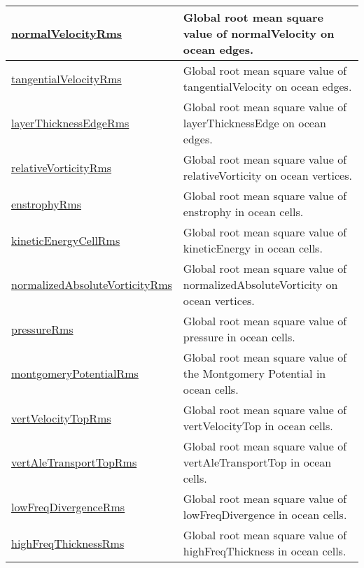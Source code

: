 {\begin{center}
\begin{longtable}{| p{2.0in} | p{4.0in} |}
    \hline
    \hyperref[subsec:var_sec_globalStatsAM_normalVelocityRms]{normalVelocityRms} & Global root mean square value of normalVelocity on ocean edges. \\
    \hline
    \hyperref[subsec:var_sec_globalStatsAM_tangentialVelocityRms]{tangentialVelocityRms} & Global root mean square value of tangentialVelocity on ocean edges. \\
    \hline
    \hyperref[subsec:var_sec_globalStatsAM_layerThicknessEdgeRms]{layerThicknessEdgeRms} & Global root mean square value of layerThicknessEdge on ocean edges. \\
    \hline
    \hyperref[subsec:var_sec_globalStatsAM_relativeVorticityRms]{relativeVorticityRms} & Global root mean square value of relativeVorticity on ocean vertices. \\
    \hline
    \hyperref[subsec:var_sec_globalStatsAM_enstrophyRms]{enstrophyRms} & Global root mean square value of enstrophy in ocean cells. \\
    \hline
    \hyperref[subsec:var_sec_globalStatsAM_kineticEnergyCellRms]{kineticEnergyCellRms} & Global root mean square value of kineticEnergy in ocean cells. \\
    \hline
    \hyperref[subsec:var_sec_globalStatsAM_normalizedAbsoluteVorticityRms]{normalizedAbsoluteVorticityRms} & Global root mean square value of normalizedAbsoluteVorticity on ocean vertices. \\
    \hline
    \hyperref[subsec:var_sec_globalStatsAM_pressureRms]{pressureRms} & Global root mean square value of pressure in ocean cells. \\
    \hline
    \hyperref[subsec:var_sec_globalStatsAM_montgomeryPotentialRms]{montgomeryPotentialRms} & Global root mean square value of the Montgomery Potential in ocean cells. \\
    \hline
    \hyperref[subsec:var_sec_globalStatsAM_vertVelocityTopRms]{vertVelocityTopRms} & Global root mean square value of vertVelocityTop in ocean cells. \\
    \hline
    \hyperref[subsec:var_sec_globalStatsAM_vertAleTransportTopRms]{vertAleTransportTopRms} & Global root mean square value of vertAleTransportTop in ocean cells. \\
    \hline
    \hyperref[subsec:var_sec_globalStatsAM_lowFreqDivergenceRms]{lowFreqDivergenceRms} & Global root mean square value of lowFreqDivergence in ocean cells. \\
    \hline
    \hyperref[subsec:var_sec_globalStatsAM_highFreqThicknessRms]{highFreqThicknessRms} & Global root mean square value of highFreqThickness in ocean cells. \\

\end{longtable}
\end{center}}
